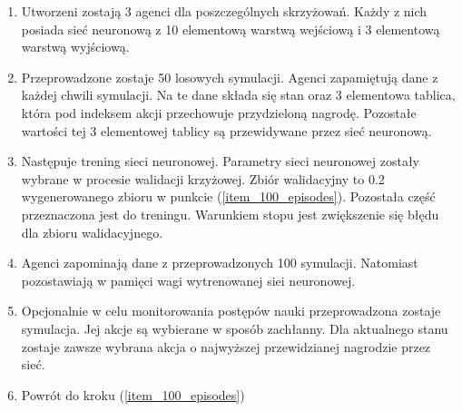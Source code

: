 \documentclass[12pt]{book}
\theoremstyle{plain}
\let\oldref\ref
\renewcommand{\ref}[1]{(\oldref{#1})}
\begin{document}
\begin{enumerate}
	\item 
	Utworzeni zostają 3 agenci dla poszczególnych skrzyżowań. Każdy z nich posiada sieć
	neuronową z 10 elementową warstwą wejściową i 3 elementową warstwą wyjściową.
	\item Przeprowadzone zostaje 50 losowych symulacji. Agenci zapamiętują dane z każdej chwili symulacji. Na te dane składa się stan oraz 3 elementowa tablica, która pod indeksem akcji przechowuje przydzieloną nagrodę. Pozostałe wartości tej 3 elementowej tablicy są przewidywane przez sieć neuronową. \label{item_100_episodes}
	\item Następuje trening sieci neuronowej. Parametry sieci neuronowej zostały wybrane w procesie walidacji krzyżowej. Zbiór walidacyjny to 0.2 wygenerowanego zbioru w punkcie \ref{item_100_episodes}. Pozostała część przeznaczona jest do treningu. Warunkiem stopu jest zwiększenie się błędu dla zbioru walidacyjnego.
	\item Agenci zapominają dane z przeprowadzonych 100 symulacji. Natomiast pozostawiają w pamięci wagi wytrenowanej siei neuronowej.
	\item Opcjonalnie w celu monitorowania postępów nauki przeprowadzona zostaje symulacja. Jej akcje są wybierane w sposób zachłanny. Dla aktualnego stanu zostaje zawsze wybrana akcja o najwyższej przewidzianej nagrodzie przez sieć.
	\item Powrót do kroku \ref{item_100_episodes}
\end{enumerate}
\end{document}
